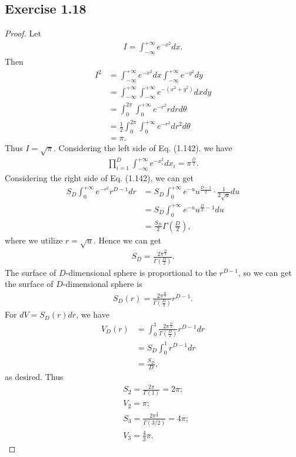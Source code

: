\documentclass[11pt]{article}
\theoremstyle{definition}
\begin{document}
\subsection{Exercise 1.18}
\begin{proof}
Let 
\begin{align*}
I = \int^{+\infty}_{-\infty}e^{-x^2}dx.
\end{align*}
Then
\begin{align*}
I^2 &= \int^{+\infty}_{-\infty}e^{-x^2}dx\int^{+\infty}_{-\infty}e^{-y^2}dy \\
&= \int^{+\infty}_{-\infty}\int^{+\infty}_{-\infty}e^{-(x^2+y^2)}dxdy \\
&= \int^{2\pi}_{0}\int^{+\infty}_{0}e^{-r^2}rdrd\theta\\
&=\frac{1}{2}\int^{2\pi}_{0}\int^{+\infty}_{0}e^{-r^2}dr^2d\theta \\
&= \pi.
\end{align*}
Thus $I = \sqrt{\pi}$. Considering the left side of Eq. (1.142). we have
\begin{align*}
\prod^D_{i=1}\int^{+\infty}_{-\infty}e^{-x_i^2}dx_i = {\pi}^{\frac{D}{2}}.
\end{align*}
Considering the right side of Eq. (1.142), we can get
\begin{align*}
S_D\int^{+\infty}_0e^{-r^2}r^{D-1}dr &= S_D\int^{+\infty}_0e^{-u}u^{\frac{D-1}{2}}\cdot \frac{1}{2\sqrt{u}}du \\
&= S_D\int^{+\infty}_0e^{-u}u^{\frac{D}{2}-1}du \\
&= \frac{S_D}{2}\Gamma(\frac{D}{2}),
\end{align*}
where we utilize $r = \sqrt{u}$. Hence we can get
\begin{align*}
S_D = \frac{2\pi^\frac{D}{2}}{\Gamma(\frac{D}{2})}.
\end{align*}
The surface of $D$-dimensional sphere  is proportional to the $r^{D-1}$, so we can get the surface of $D$-dimensional sphere is
\begin{align*}
S_D(r) = \frac{2\pi^\frac{D}{2}}{\Gamma(\frac{D}{2})}r^{D-1}.
\end{align*}
For $dV = S_D(r)dr$, we have
\begin{align*}
V_D(r) &= \int^1_0\frac{2\pi^\frac{D}{2}}{\Gamma(\frac{D}{2})}r^{D-1}dr \\
&= S_D\int_0^1r^{D-1}dr\\
&= \frac{S_D}{D},
\end{align*}
as desired. Thus
\begin{align*}
&S_2 = \frac{2\pi}{\Gamma(1)} = 2\pi ;\\
&V_2 = \pi ;\\
&S_3 = \frac{2\pi ^{\frac{3}{2}}}{\Gamma (3/2)} = 4\pi ;\\
&V_3 = \frac{4}{3}\pi .
\end{align*}
\end{proof} 
\end{document}
